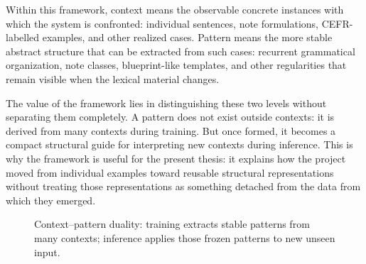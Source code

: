 \documentclass[12pt,a4paper,oneside]{report}
\begin{document}
Within this framework, context means the observable concrete instances with which the system is confronted: individual sentences, note formulations, CEFR-labelled examples, and other realized cases. Pattern means the more stable abstract structure that can be extracted from such cases: recurrent grammatical organization, note classes, blueprint-like templates, and other regularities that remain visible when the lexical material changes.

The value of the framework lies in distinguishing these two levels without separating them completely. A pattern does not exist outside contexts: it is derived from many contexts during training. But once formed, it becomes a compact structural guide for interpreting new contexts during inference. This is why the framework is useful for the present thesis: it explains how the project moved from individual examples toward reusable structural representations without treating those representations as something detached from the data from which they emerged.

\begin{figure}[H]
\centering
{}
\caption{Context--pattern duality: training extracts stable patterns from many contexts; inference applies those frozen patterns to new unseen input.}
\label{fig:cpduality}
\end{figure}
\end{document}
